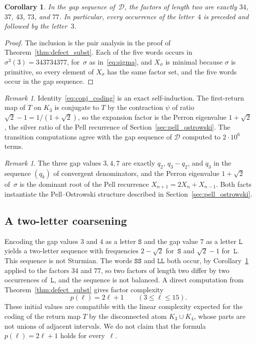 \documentclass{birkjour}
\newtheorem{corollary}[theorem]{Corollary}
\theoremstyle{definition}
\theoremstyle{remark}
\newtheorem{remark}[theorem]{Remark}
\begin{document}
\begin{corollary}\label{cor:343}
In the gap sequence of~$\mathcal{D}$, the factors of length
two are exactly $34$, $37$, $43$, $73$, and $77$. In
particular, every occurrence of the letter~$4$ is preceded
and followed by the letter~$3$.
\end{corollary}

\begin{proof}
The inclusion is the pair analysis in the proof of
Theorem~\ref{thm:defect_subst}. Each of the five words
occurs in $\sigma^{3}(3)=343734377$,
for~$\sigma$ as in~\eqref{eq:sigma}, and $X_{\sigma}$ is
minimal because $\sigma$ is primitive, so every element of
$X_{\sigma}$ has the same factor set, and the five words
occur in the gap sequence.
\end{proof}

\begin{remark}
Identity~\eqref{eq:conj_coding} is an exact self-induction.
The first-return map of $T$ on $K_{3}$ is conjugate to $T$
by the contraction $\psi$ of ratio
$\sqrt{2}-1=1/(1+\sqrt{2})$, so the expansion factor is the
Perron eigenvalue $1+\sqrt{2}$, the
silver ratio of the Pell recurrence of
Section~\ref{sec:pell_ostrowski}. The transition
computations agree with the gap sequence of $\mathcal{D}$
computed to $2\cdot 10^{6}$ terms.
\end{remark}

\begin{remark}
The three gap values $3,4,7$ are exactly
$q_{2}$, $q_{3}-q_{2}$, and $q_{3}$ in the sequence
$(q_{k})$ of convergent denominators, and the Perron eigenvalue
$1+\sqrt{2}$ of~$\sigma$ is the dominant root of
the Pell recurrence $X_{n+1}=2X_{n}+X_{n-1}$. Both
facts
instantiate the Pell--Ostrowski structure described
in Section~\ref{sec:pell_ostrowski}.
\end{remark}

\subsection{A two-letter coarsening}

Encoding the gap values $3$ and $4$ as a letter
$\mathtt{S}$ and the gap value $7$ as a letter $\mathtt{L}$
yields a two-letter sequence with frequencies $2-\sqrt{2}$
for~$\mathtt{S}$ and $\sqrt{2}-1$ for~$\mathtt{L}$. This
sequence is not Sturmian. The words $\mathtt{SS}$ and
$\mathtt{LL}$ both occur, by Corollary~\ref{cor:343} applied
to the factors $34$ and $77$, so two factors of length two
differ by two occurrences of~$\mathtt{L}$, and the sequence
is not balanced.
A direct computation from Theorem~\ref{thm:defect_subst}
gives factor complexity
\[
  p(\ell)=2\ell+1\qquad(3\le\ell\le 15).
\]
These initial values are compatible with the linear
complexity expected for the coding of the return map $T$ by
the disconnected atom $K_{3}\cup K_{4}$, whose parts are not
unions of adjacent intervals. We do not claim that the formula
$p(\ell)=2\ell+1$ holds for every~$\ell$.
\end{document}
